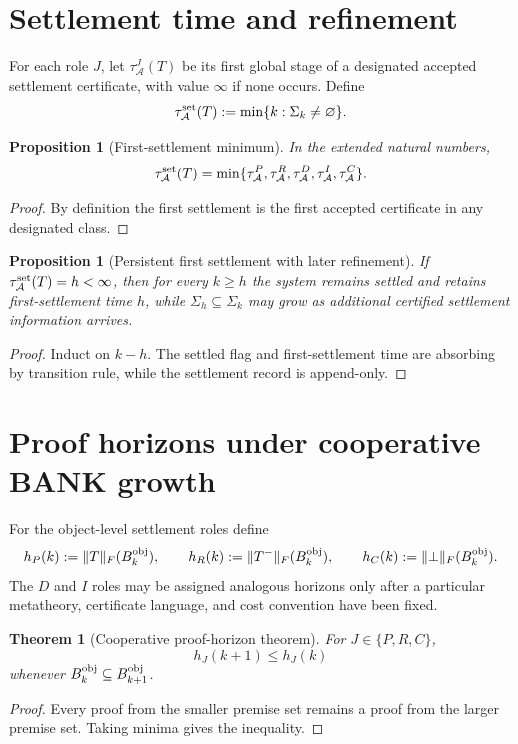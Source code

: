 \documentclass[11pt]{article}
\newtheorem{theorem}[definition]{Theorem}
\newtheorem{proposition}[definition]{Proposition}
\theoremstyle{remark}
\begin{document}
\section{Settlement time and refinement}
For each role $J$, let $\tau^J_{\mathcal A}(T)$ be its first global stage of a designated accepted settlement certificate, with value $\infty$ if none occurs. Define
\[
\tau^{\rm set}_{\mathcal A}(T):=
\min\{k:\Sigma_k\ne\varnothing\}.
\]

\begin{proposition}[First-settlement minimum]
In the extended natural numbers,
\[
\tau^{\rm set}_{\mathcal A}(T)
=
\min\{\tau^P_{\mathcal A},\tau^R_{\mathcal A},\tau^D_{\mathcal A},\tau^I_{\mathcal A},\tau^C_{\mathcal A}\}.
\]
\end{proposition}
\begin{proof}
By definition the first settlement is the first accepted certificate in any designated class.
\end{proof}

\begin{proposition}[Persistent first settlement with later refinement]
If $\tau^{\rm set}_{\mathcal A}(T)=h<\infty$, then for every $k\ge h$ the system remains settled and retains first-settlement time $h$, while $\Sigma_h\subseteq\Sigma_k$ may grow as additional certified settlement information arrives.
\end{proposition}
\begin{proof}
Induct on $k-h$. The settled flag and first-settlement time are absorbing by transition rule, while the settlement record is append-only.
\end{proof}

\section{Proof horizons under cooperative BANK growth}
For the object-level settlement roles define
\[
h_P(k):=\|T\|_F(B_k^{\rm obj}),\qquad
h_R(k):=\|T^-\|_F(B_k^{\rm obj}),\qquad
h_C(k):=\|\bot\|_F(B_k^{\rm obj}).
\]
The $D$ and $I$ roles may be assigned analogous horizons only after a particular metatheory, certificate language, and cost convention have been fixed.

\begin{theorem}[Cooperative proof-horizon theorem]
For $J\in\{P,R,C\}$,
\[
h_J(k+1)\le h_J(k)
\]
whenever $B_k^{\rm obj}\subseteq B_{k+1}^{\rm obj}$.
\end{theorem}
\begin{proof}
Every proof from the smaller premise set remains a proof from the larger premise set. Taking minima gives the inequality.
\end{proof}
\end{document}
